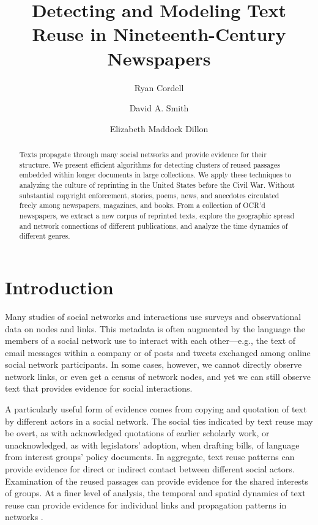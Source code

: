 \documentclass[pdftex,11pt]{article}
\begin{document}
\title{Detecting and Modeling Text Reuse in Nineteenth-Century Newspapers}

\author{Ryan Cordell \and David A. Smith \and Elizabeth Maddock Dillon}

\date{}

\maketitle


\begin{abstract}
  Texts propagate through many social networks and provide evidence
  for their structure.  We present efficient algorithms for detecting
  clusters of reused passages embedded within longer documents in
  large collections.  We apply these techniques to analyzing the
  culture of reprinting in the United States before the Civil War.
  Without substantial copyright enforcement, stories, poems, news, and
  anecdotes circulated freely among newspapers, magazines, and books.
  From a collection of OCR'd newspapers, we extract a new corpus of
  reprinted texts, explore the geographic spread and network
  connections of different publications, and analyze the time dynamics
  of different genres.
\end{abstract}

\section{Introduction}
\label{sec:intro}

Many studies of social networks and interactions use surveys and
observational data on nodes and links.  This metadata is often
augmented by the language the members of a social network use to
interact with each other---e.g., the text of email messages within a
company or of posts and tweets exchanged among online social network
participants.  In some cases, however, we cannot directly observe
network links, or even get a census of network nodes, and yet we can
still observe text that provides evidence for social interactions.

A particularly useful form of evidence comes from copying and
quotation of text by different actors in a social network.  The social
ties indicated by text reuse may be overt, as with acknowledged
quotations of earlier scholarly work, or unacknowledged, as with
legislators' adoption, when drafting bills, of language from interest
groups' policy documents.  In aggregate, text reuse patterns can
provide evidence for direct or indirect contact between different
social actors.  Examination of the reused passages can provide
evidence for the shared interests of groups.  At a finer level of
analysis, the temporal and spatial dynamics of text reuse can provide
evidence for individual links and propagation patterns in networks
\citep{leskovec09:_meme_dynam_news_cycle,lease12:_findin_explor_memes_social_media}.
\end{document}
